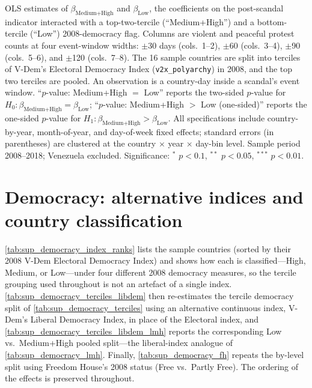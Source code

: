 \documentclass[11pt]{article}
\let\mathbetasym\beta
\renewcommand{\beta}{\ensuremath{\mathbetasym}}
\begin{document}
\begin{table}[htb!]
    \caption{Effect by 2008 level of democracy: Low vs.\ Medium+High.}
    \label{tab:sup_democracy_lmh}
    \begin{center}
        \scriptsize{}
    \end{center}
    \footnotesize{OLS estimates of $\beta_{\text{Medium+High}}$ and $\beta_{\text{Low}}$, the coefficients on the post-scandal indicator interacted with a top-two-tercile (``Medium+High'') and a bottom-tercile (``Low'') 2008-democracy flag. Columns are violent and peaceful protest counts at four event-window widths: $\pm$30 days (cols.\ 1--2), $\pm$60 (cols.\ 3--4), $\pm$90 (cols.\ 5--6), and $\pm$120 (cols.\ 7--8). The 16 sample countries are split into terciles of V-Dem's Electoral Democracy Index (\texttt{v2x\_polyarchy}) in 2008, and the top two terciles are pooled. An observation is a country-day inside a scandal's event window. ``$p$-value: Medium+High $=$ Low'' reports the two-sided $p$-value for $H_0:\beta_{\text{Medium+High}}=\beta_{\text{Low}}$; ``$p$-value: Medium+High $>$ Low (one-sided)'' reports the one-sided $p$-value for $H_1:\beta_{\text{Medium+High}}>\beta_{\text{Low}}$. All specifications include country-by-year, month-of-year, and day-of-week fixed effects; standard errors (in parentheses) are clustered at the country $\times$ year $\times$ day-bin level. Sample period 2008--2018; Venezuela excluded. Significance: $^{*}$ $p<0.1$, $^{**}$ $p<0.05$, $^{***}$ $p<0.01$.}
\end{table}

\clearpage
\section{Democracy: alternative indices and country classification}\label{sup:democracy_alt}

\autoref{tab:sup_democracy_index_ranks} lists the sample countries (sorted by their 2008 V-Dem Electoral Democracy Index) and shows how each is classified---High, Medium, or Low---under four different 2008 democracy measures, so the tercile grouping used throughout is not an artefact of a single index. \autoref{tab:sup_democracy_terciles_libdem} then re-estimates the tercile democracy split of \autoref{tab:sup_democracy_terciles} using an alternative continuous index, V-Dem's Liberal Democracy Index, in place of the Electoral index, and \autoref{tab:sup_democracy_terciles_libdem_lmh} reports the corresponding Low vs.\ Medium+High pooled split---the liberal-index analogue of \autoref{tab:sup_democracy_lmh}. Finally, \autoref{tab:sup_democracy_fh} repeats the by-level split using Freedom House's 2008 status (Free vs.\ Partly Free). The ordering of the effects is preserved throughout.
\end{document}
